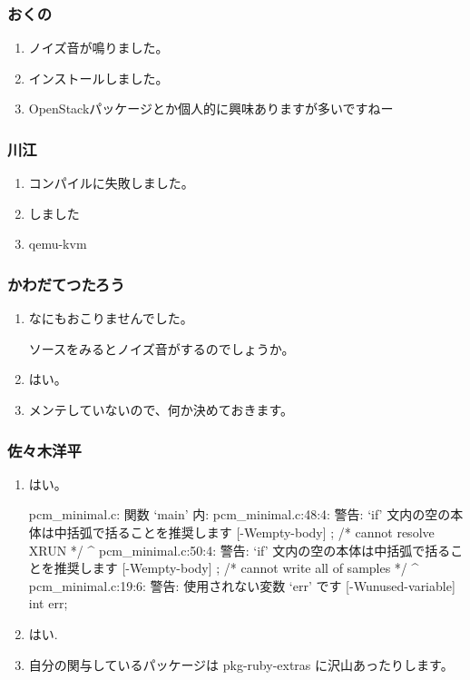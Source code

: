 \documentclass[cjk,dvipdfmx,10pt,compress,%
hyperref={bookmarks=true,bookmarksnumbered=true,bookmarksopen=false,%
colorlinks=false,%
pdftitle={第 77 回 関西 Debian 勉強会},%
pdfauthor={倉敷・のがた・佐々木・かわだ・八津尾},%
pdfsubject={資料},%
}]{beamer}
\begin{document}
\begin{frame}
  \frametitle{ おくの }
  \begin{enumerate}
  \item ノイズ音が鳴りました。
  \item インストールしました。
  \item OpenStackパッケージとか個人的に興味ありますが多いですねー
  \end{enumerate}
\end{frame}

\begin{frame}
  \frametitle{ 川江 }
  \begin{enumerate}
  \item コンパイルに失敗しました。
  \item しました
  \item qemu-kvm
  \end{enumerate}
\end{frame}

\begin{frame}
  \frametitle{ かわだてつたろう }
  \begin{enumerate}
  \item なにもおこりませんでした。

    ソースをみるとノイズ音がするのでしょうか。
  \item はい。
  \item メンテしていないので、何か決めておきます。
  \end{enumerate}
\end{frame}

\begin{frame}[containsverbatim]
  \frametitle{ 佐々木洋平 }
  \begin{enumerate}
  \item はい。
    \begin{commandline}
pcm_minimal.c: 関数 ‘main’ 内:
pcm_minimal.c:48:4: 警告: ‘if’ 文内の空の本体は中括弧で括ることを推奨します [-Wempty-body]
    ; /* cannot resolve XRUN */
    ^
pcm_minimal.c:50:4: 警告: ‘if’ 文内の空の本体は中括弧で括ることを推奨します [-Wempty-body]
    ; /* cannot write all of samples */
    ^
pcm_minimal.c:19:6: 警告: 使用されない変数 ‘err’ です [-Wunused-variable]
  int err;
    \end{commandline}
  \item はい. 
  \item 自分の関与しているパッケージは pkg-ruby-extras に沢山あったりします。
  \end{enumerate}
\end{frame}
\end{document}
